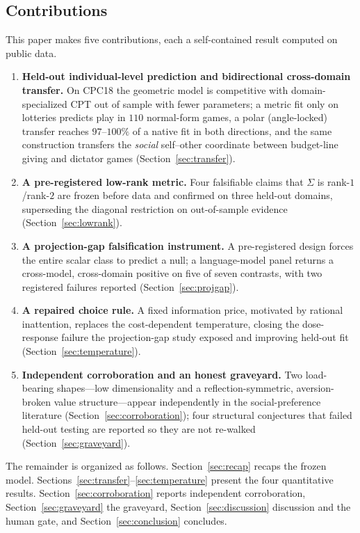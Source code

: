 \documentclass[journal]{IEEEtran}
\begin{document}
\subsection{Contributions}
This paper makes five contributions, each a self-contained result computed on public data.
\begin{enumerate}
    \item \textbf{Held-out individual-level prediction and bidirectional cross-domain transfer.} On CPC18 the geometric model is competitive with domain-specialized CPT out of sample with fewer parameters; a metric fit only on lotteries predicts play in $110$ normal-form games, a polar (angle-locked) transfer reaches $97$--$100\%$ of a native fit in both directions, and the same construction transfers the \emph{social} self--other coordinate between budget-line giving and dictator games (Section~\ref{sec:transfer}).
    \item \textbf{A pre-registered low-rank metric.} Four falsifiable claims that $\Sigma$ is rank-$1$/rank-$2$ are frozen before data and confirmed on three held-out domains, superseding the diagonal restriction on out-of-sample evidence (Section~\ref{sec:lowrank}).
    \item \textbf{A projection-gap falsification instrument.} A pre-registered design forces the entire scalar class to predict a null; a language-model panel returns a cross-model, cross-domain positive on five of seven contrasts, with two registered failures reported (Section~\ref{sec:projgap}).
    \item \textbf{A repaired choice rule.} A fixed information price, motivated by rational inattention, replaces the cost-dependent temperature, closing the dose-response failure the projection-gap study exposed and improving held-out fit (Section~\ref{sec:temperature}).
    \item \textbf{Independent corroboration and an honest graveyard.} Two load-bearing shapes---low dimensionality and a reflection-symmetric, aversion-broken value structure---appear independently in the social-preference literature (Section~\ref{sec:corroboration}); four structural conjectures that failed held-out testing are reported so they are not re-walked (Section~\ref{sec:graveyard}).
\end{enumerate}

The remainder is organized as follows.
Section~\ref{sec:recap} recaps the frozen model.
Sections~\ref{sec:transfer}--\ref{sec:temperature} present the four quantitative results.
Section~\ref{sec:corroboration} reports independent corroboration, Section~\ref{sec:graveyard} the graveyard, Section~\ref{sec:discussion} discussion and the human gate, and Section~\ref{sec:conclusion} concludes.
\end{document}
